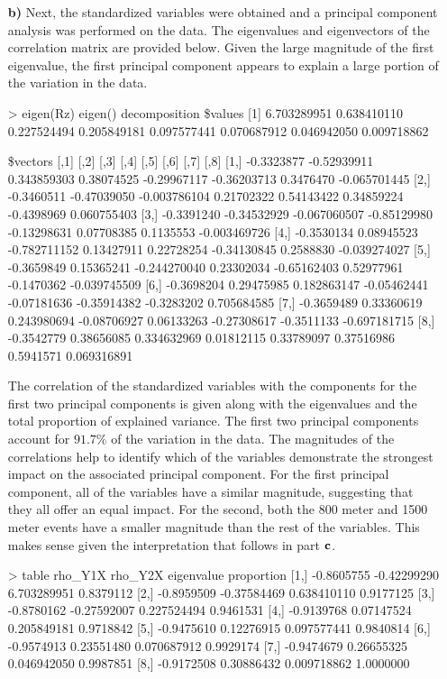 \begin{enumerate}
\item[\bf{b)}]
	Next, the standardized variables were obtained and a principal component analysis was performed on the data. The eigenvalues and eigenvectors of the correlation matrix are provided below. Given the large magnitude of the first eigenvalue, the first principal component appears to explain a large portion of the variation in the data.

\begin{rc}

> eigen(Rz)
eigen() decomposition
\$values
[1] 6.703289951 0.638410110 0.227524494 0.205849181 0.097577441 0.070687912 0.046942050 0.009718862

\$vectors
           [,1]        [,2]         [,3]        [,4]        [,5]        [,6]       [,7]         [,8]
[1,] -0.3323877 -0.52939911  0.343859303  0.38074525 -0.29967117 -0.36203713  0.3476470 -0.065701445
[2,] -0.3460511 -0.47039050 -0.003786104  0.21702322  0.54143422  0.34859224 -0.4398969  0.060755403
[3,] -0.3391240 -0.34532929 -0.067060507 -0.85129980 -0.13298631  0.07708385  0.1135553 -0.003469726
[4,] -0.3530134  0.08945523 -0.782711152  0.13427911  0.22728254 -0.34130845  0.2588830 -0.039274027
[5,] -0.3659849  0.15365241 -0.244270040  0.23302034 -0.65162403  0.52977961 -0.1470362 -0.039745509
[6,] -0.3698204  0.29475985  0.182863147 -0.05462441 -0.07181636 -0.35914382 -0.3283202  0.705684585
[7,] -0.3659489  0.33360619  0.243980694 -0.08706927  0.06133263 -0.27308617 -0.3511133 -0.697181715
[8,] -0.3542779  0.38656085  0.334632969  0.01812115  0.33789097  0.37516986  0.5941571  0.069316891
\end{rc}

The correlation of the standardized variables with the components for the first two principal components is given along with the eigenvalues and the total proportion of explained variance. The first two principal components account for $91.7\%$ of the variation in the data. The magnitudes of the correlations help to identify which of the variables demonstrate the strongest impact on the associated principal component. For the first principal component, all of the variables have a similar magnitude, suggesting that they all offer an equal impact. For the second, both the 800 meter and 1500 meter events have a smaller magnitude than the rest of the variables. This makes sense given the interpretation that follows in part $\bf{c}$. 

\begin{rc}

> table
        rho_Y1X     rho_Y2X  eigenvalue proportion
[1,] -0.8605755 -0.42299290 6.703289951  0.8379112
[2,] -0.8959509 -0.37584469 0.638410110  0.9177125
[3,] -0.8780162 -0.27592007 0.227524494  0.9461531
[4,] -0.9139768  0.07147524 0.205849181  0.9718842
[5,] -0.9475610  0.12276915 0.097577441  0.9840814
[6,] -0.9574913  0.23551480 0.070687912  0.9929174
[7,] -0.9474679  0.26655325 0.046942050  0.9987851
[8,] -0.9172508  0.30886432 0.009718862  1.0000000
\end{rc}



\end{enumerate}
